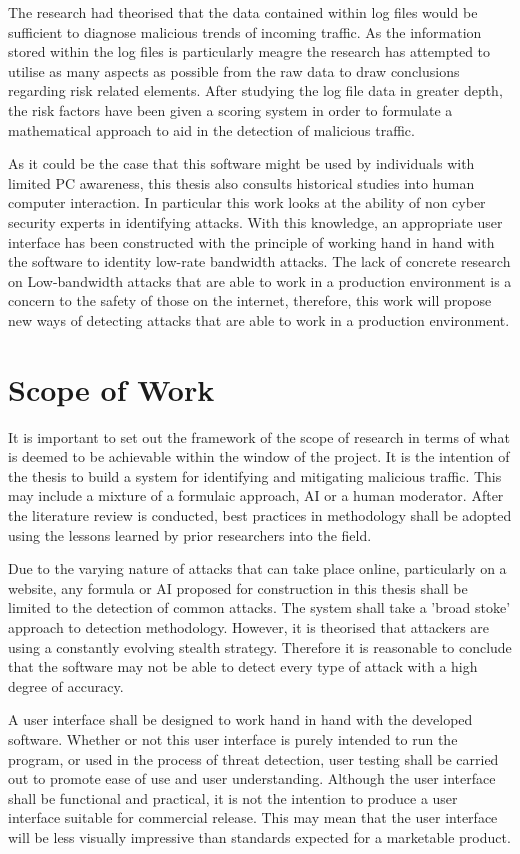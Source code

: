 The research had theorised that the data contained within log files would be sufficient to diagnose malicious trends of incoming traffic. As the information stored within the log files is particularly meagre the research has attempted to utilise as many aspects as possible from the raw data to draw conclusions regarding risk related elements. After studying the log file data in greater depth, the risk factors have been given a scoring system in order to formulate a mathematical approach to aid in the detection of malicious traffic. 

As it could be the case that this software might be used by individuals with limited PC awareness, this thesis also consults historical studies into human computer interaction. In particular this work looks at the ability of non cyber security experts in identifying attacks. With this knowledge, an appropriate user interface has been constructed with the principle of working hand in hand with the software to identity low-rate bandwidth attacks. The lack of concrete research on Low-bandwidth attacks that are able to work in a production environment is a concern to the safety of those on the internet, therefore, this work will propose new ways of detecting attacks that are able to work in a production environment.

\section{Scope of Work}

It is important to set out the framework of the scope of research in terms of what is deemed to be achievable within the window of the project. It is the intention of the thesis to build a system for identifying and mitigating malicious traffic. This may include a mixture of a formulaic approach, AI or a human moderator. After the literature review is conducted, best practices in methodology shall be adopted using the lessons learned by prior researchers into the field.

Due to the varying nature of attacks that can take place online, particularly on a website, any formula or AI proposed for construction in this thesis shall be limited to the detection of common attacks. The system shall take a 'broad stoke' approach to detection methodology. However, it is theorised that attackers are using a constantly evolving stealth strategy. Therefore it is reasonable to conclude that the software may not be able to detect every type of attack with a high degree of accuracy.

A user interface shall be designed to work hand in hand with the developed software. Whether or not this user interface is purely intended to run the program, or used in the process of threat detection, user testing shall be carried out to promote ease of use and user understanding. Although the user interface shall be functional and practical, it is not the intention to produce a user interface suitable for commercial release. This may mean that the user interface will be less visually impressive than standards expected for a marketable product.









